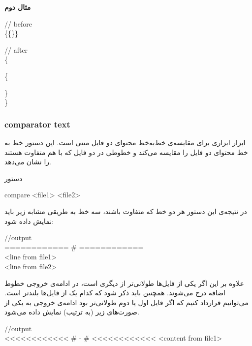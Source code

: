 \documentclass[]{article}
\begin{document}
\textbf{مثال دوم}\\

\begin{latin}
{\mymono
// before\\
\{\{\}\;\;\;\;\;\;\;\;\;\;\;\;\;\;\;\;\;\}\\
}
\end{latin}

\begin{latin}
{\mymono
// after\\
\{

\;\;\;\;\{

\;\;\;\;\}\\
\}
}
\end{latin}

\newpage
\subsubsection*{{\titr comparator text}}

ابزار  ابزاری برای مقایسه‌ی خط‌به‌خط محتوای دو فایل متنی است. این دستور خط به خط محتوای دو فایل را مقایسه می‌کند و خطوطی در دو فایل که با هم متفاوت هستند را نشان می‌دهد. 

\begin{mybox}[colback=yellow]{دستور}
	\begin{latin}	
		compare  <file1> <file2> 
	\end{latin}
\end{mybox}

در نتیجه‌ی این دستور هر دو خط که متفاوت باشند،‌ سه خط به طریقی مشابه زیر باید نمایش داده شود:

\begin{latin}
{\mymono
//output\\
============  \#<line number>  ============\\
<line from file1>\\
<line from file2>
}
\end{latin}

علاوه بر این اگر یکی از فایل‌ها طولانی‌تر از دیگری‌ است، در ادامه‌ی خروجی خطوط اضافه درج می‌شوند. همچنین باید ذکر شود که کدام یک از فایل‌ها بلندتر است. می‌توانیم قرارداد کنیم که اگر فایل اول یا دوم طولانی‌تر بود ادامه‌ی خروجی به یکی از صورت‌های زیر (به ترتیب) نمایش داده می‌شود.

\begin{latin}
{\mymono
//output\\
<<<<<<<<<<<< \#<start line number> - \#<end line number> <<<<<<<<<<<<
<content from file1>
}
\end{latin}
\end{document}
